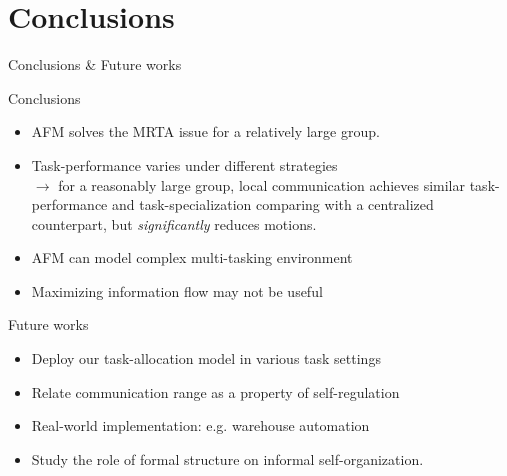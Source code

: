 \documentclass{beamer}
\begin{document}
\section{Conclusions}
\begin{frame}[t]{Conclusions \& Future works}
\begin{block}{Conclusions}
\begin{itemize}
    \item \small \alert{AFM solves the MRTA issue} for a relatively large group.\\
    \item \small \alert{Task-performance varies under different strategies}\\
    $\rightarrow$ \small for a reasonably large group, local  communication achieves similar task-performance and task-specialization comparing with a centralized counterpart, but \textit{significantly} reduces motions.    
    \item \small AFM can model complex \alert{multi-tasking environment}\\
    \item \small \alert{Maximizing information flow} may not be  useful\\
 \end{itemize}
 \end{block}
\begin{block}{Future works} 
 \begin{itemize}
    \item \small Deploy our task-allocation model \alert{in various task settings}\\
    \item \small Relate \alert{communication range} as a property of self-regulation\\
    \item \small \alert{Real-world implementation:} e.g. warehouse automation\\
     \item \small Study the \alert{role of formal structure} on informal self-organization.
    \end{itemize}
\end{block}
\end{frame}
\end{document}
